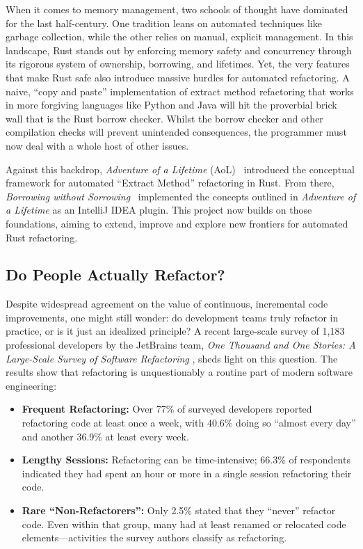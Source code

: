 When it comes to memory management, two schools of thought have dominated for
the last half-century. One tradition leans on automated techniques like garbage
collection, while the other relies on manual, explicit management. In this
landscape, Rust stands out by enforcing memory safety and concurrency through
its rigorous system of ownership, borrowing, and lifetimes. Yet, the very
features that make Rust safe also introduce massive hurdles for automated
refactoring. A naive, “copy and paste” implementation of extract method
refactoring that works in more forgiving languages like Python and Java will hit
the proverbial brick wall that is the Rust borrow checker. Whilst the borrow
checker and other compilation checks will prevent unintended consequences, the
programmer must now deal with a whole host of other issues.

Against this backdrop, \textit{Adventure of a Lifetime} (AoL)~\cite{AdventureOfALifetime}
introduced the conceptual framework for automated “Extract Method” refactoring
in Rust. From there, \textit{Borrowing without Sorrowing}~\cite{BorrowingWithoutSorrowing}
implemented the concepts outlined in \textit{Adventure of a Lifetime} as an
IntelliJ IDEA plugin. This project now builds on those foundations, aiming to
extend, improve and explore new frontiers for automated Rust refactoring.

\subsection{Do People Actually Refactor?}
\label{sec:do-people-refactor}

Despite widespread agreement on the value of continuous, incremental code
improvements, one might still wonder: do development teams truly refactor in
practice, or is it just an idealized principle? A recent large-scale survey of
1,183 professional developers by the JetBrains team, \textit{One Thousand and
One Stories: A Large-Scale Survey of Software
Refactoring} \cite{OneThousandOneStories-SoftwareRefactoring},
sheds light on this question. The results show that refactoring is
unquestionably a routine part of modern software engineering:

\begin{itemize}
    \item \textbf{Frequent Refactoring:} Over 77\% of surveyed developers
    reported refactoring code at least once a week, with 40.6\% doing so “almost
    every day” and another 36.9\% at least every week.
    \item \textbf{Lengthy Sessions:} Refactoring can be time-intensive; 66.3\%
    of respondents indicated they had spent an hour or more in a single session
    refactoring their code.
    \item \textbf{Rare “Non-Refactorers”:} Only 2.5\% stated that they “never”
    refactor code. Even within that group, many had at least renamed or
    relocated code elements—activities the survey authors classify as
    refactoring.
\end{itemize}

